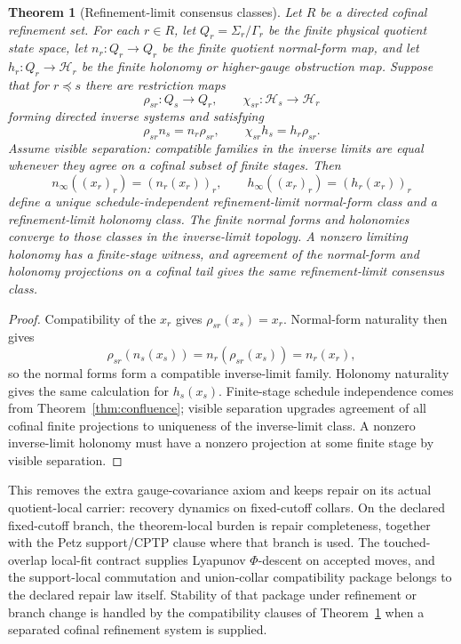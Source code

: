 \documentclass[11pt]{article}
\newtheorem{theorem}{Theorem}[section]
\begin{document}
\begin{theorem}[Refinement-limit consensus classes]\label{thm:consensusrefinement}
Let \(R\) be a directed cofinal refinement set. For each \(r\in R\), let
\(Q_r=\Sigma_r/\Gamma_r\) be the finite physical quotient state space, let
\(n_r:Q_r\to Q_r\) be the finite quotient normal-form map, and let
\(h_r:Q_r\to\mathcal H_r\) be the finite holonomy or higher-gauge obstruction map. Suppose that
for \(r\preceq s\) there are restriction maps
\[
\rho_{sr}:Q_s\to Q_r,\qquad \chi_{sr}:\mathcal H_s\to\mathcal H_r
\]
forming directed inverse systems and satisfying
\[
\rho_{sr}n_s=n_r\rho_{sr},
\qquad
\chi_{sr}h_s=h_r\rho_{sr}.
\]
Assume visible separation: compatible families in the inverse limits are equal whenever they
agree on a cofinal subset of finite stages. Then
\[
n_\infty((x_r)_r)=(n_r(x_r))_r,
\qquad
h_\infty((x_r)_r)=(h_r(x_r))_r
\]
define a unique schedule-independent refinement-limit normal-form class and a refinement-limit
holonomy class. The finite normal forms and holonomies converge to those classes in the
inverse-limit topology. A nonzero limiting holonomy has a finite-stage witness, and agreement of
the normal-form and holonomy projections on a cofinal tail gives the same refinement-limit
consensus class.
\end{theorem}

\begin{proof}
Compatibility of the \(x_r\) gives \(\rho_{sr}(x_s)=x_r\). Normal-form naturality then gives
\[
\rho_{sr}(n_s(x_s))=n_r(\rho_{sr}(x_s))=n_r(x_r),
\]
so the normal forms form a compatible inverse-limit family. Holonomy naturality gives the same
calculation for \(h_s(x_s)\). Finite-stage schedule independence comes from
Theorem~\ref{thm:confluence}; visible separation upgrades agreement of all cofinal finite
projections to uniqueness of the inverse-limit class. A nonzero inverse-limit holonomy must have
a nonzero projection at some finite stage by visible separation.
\end{proof}

This removes the extra gauge-covariance axiom and keeps repair on its actual quotient-local
carrier: recovery dynamics on fixed-cutoff collars. On the declared fixed-cutoff branch, the
theorem-local burden is repair completeness, together with the Petz support/CPTP clause
where that branch is used. The touched-overlap local-fit contract supplies Lyapunov
\(\Phi\)-descent on accepted moves, and the support-local commutation and union-collar
compatibility package belongs to the declared repair law itself. Stability of that package under
refinement or branch change is handled by the compatibility clauses of
Theorem~\ref{thm:consensusrefinement} when a separated cofinal refinement system is supplied.
\end{document}
